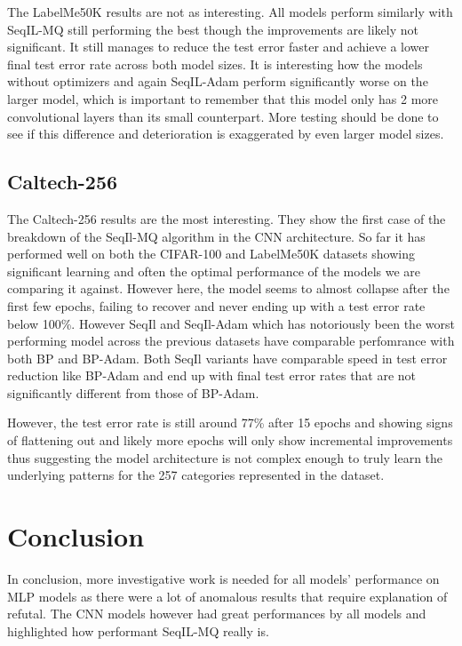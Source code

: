 \documentclass{article}
\theoremstyle{plain}
\theoremstyle{definition}
\theoremstyle{remark}
\begin{document}
The LabelMe50K results are not as interesting. All models perform similarly with SeqIL-MQ
still performing the best though the improvements are likely not significant. It still manages 
to reduce the test error faster and achieve a lower final test error rate across both model sizes.
It is interesting how the models without optimizers and again SeqIL-Adam perform significantly worse on the larger
model, which is important to remember that this model only has 2 more convolutional layers than its small
counterpart. More testing should be done to see if this difference and deterioration is exaggerated 
by even larger model sizes.

\subsection*{Caltech-256}

The Caltech-256 results are the most interesting. They show the first case of the 
breakdown of the SeqIl-MQ algorithm in the CNN architecture. So far it has performed well
on both the CIFAR-100 and LabelMe50K datasets showing significant learning and often the optimal performance 
of the models we are comparing it against. However here, the model seems to almost 
collapse after the first few epochs, failing to recover and never ending up with a
test error rate below 100\%. However SeqIl and SeqIl-Adam which has notoriously been the worst 
performing model across the previous datasets have comparable perfomrance with both BP and BP-Adam. 
Both SeqIl variants have comparable speed in test error reduction like BP-Adam and end up 
with final test error rates that are not significantly different from those of BP-Adam.

However, the test error rate is still around 77\% after 15 epochs and showing signs of 
flattening out and likely more epochs will only show incremental improvements thus suggesting
the model architecture is not complex enough to truly learn the underlying patterns for the 
257 categories represented in the dataset. 

\section{Conclusion}

In conclusion, more investigative work is needed for all models' performance on MLP models as there 
were a lot of anomalous results that require explanation of refutal. The CNN models however had great performances
by all models and highlighted how performant SeqIL-MQ really is. 
\end{document}
